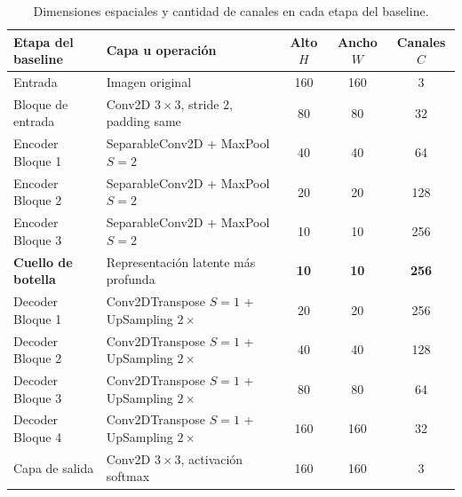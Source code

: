 \documentclass[10pt,letterpaper]{article}
\begin{document}
\begin{table}[H]
    \centering
    \small
    \caption{Dimensiones espaciales y cantidad de canales en cada etapa del baseline.}
    \label{tab_dimensiones_manual}
    \begin{tabular}{llccc}
        \toprule
        \textbf{Etapa del baseline} & \textbf{Capa u operación}                     & \textbf{Alto $H$} & \textbf{Ancho $W$} & \textbf{Canales $C$} \\
        \midrule
        Entrada                     & Imagen original                               & 160               & 160                & 3                    \\
        Bloque de entrada           & Conv2D $3 \times 3$, stride 2, padding same   & 80                & 80                 & 32                   \\
        Encoder Bloque 1            & SeparableConv2D + MaxPool $S=2$               & 40                & 40                 & 64                   \\
        Encoder Bloque 2            & SeparableConv2D + MaxPool $S=2$               & 20                & 20                 & 128                  \\
        Encoder Bloque 3            & SeparableConv2D + MaxPool $S=2$               & 10                & 10                 & 256                  \\
        \midrule
        \textbf{Cuello de botella}  & Representación latente más profunda           & \textbf{10}       & \textbf{10}        & \textbf{256}         \\
        \midrule
        Decoder Bloque 1            & Conv2DTranspose $S=1$ + UpSampling $2 \times$ & 20                & 20                 & 256                  \\
        Decoder Bloque 2            & Conv2DTranspose $S=1$ + UpSampling $2 \times$ & 40                & 40                 & 128                  \\
        Decoder Bloque 3            & Conv2DTranspose $S=1$ + UpSampling $2 \times$ & 80                & 80                 & 64                   \\
        Decoder Bloque 4            & Conv2DTranspose $S=1$ + UpSampling $2 \times$ & 160               & 160                & 32                   \\
        Capa de salida              & Conv2D $3 \times 3$, activación softmax       & 160               & 160                & 3                    \\
        \bottomrule
    \end{tabular}
\end{table}
\end{document}
